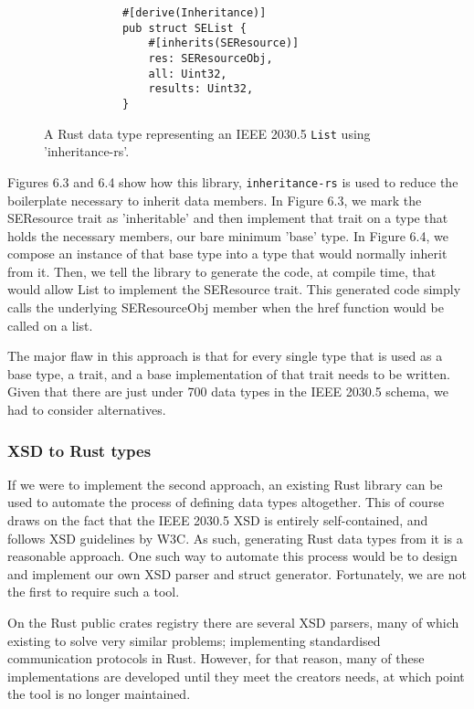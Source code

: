 \begin{figure}[H]
    \begin{center}
        \begin{lstlisting}
            #[derive(Inheritance)]
            pub struct SEList {
                #[inherits(SEResource)]
                res: SEResourceObj,
                all: Uint32,
                results: Uint32,
            }
        \end{lstlisting}
        \label{fig:listinher}
        \caption{A Rust data type representing an IEEE 2030.5 \texttt{List} using 'inheritance-rs'.}
    \end{center}
\end{figure}


Figures 6.3 and 6.4 show how this library, \texttt{inheritance-rs} \cite[]{inheritancers} is used to reduce the boilerplate necessary to inherit data members. 
In Figure 6.3, we mark the SEResource trait as 'inheritable' and then implement that trait on a type that holds the necessary members, our bare minimum 'base' type. 
In Figure 6.4, we compose an instance of that base type into a type that would normally inherit from it. Then, we tell the library to generate the code, at compile time, that would allow List to implement the SEResource trait.
This generated code simply calls the underlying SEResourceObj member when the href function would be called on a list.

The major flaw in this approach is that for every single type that is used as a base type, a trait, and a base implementation of that trait needs to be written.
Given that there are just under 700 data types in the IEEE 2030.5 schema, we had to consider alternatives.


\subsubsection{XSD to Rust types}

If we were to implement the second approach, an existing Rust library can be used to automate the process of defining data types altogether.
This of course draws on the fact that the IEEE 2030.5 XSD is entirely self-contained, and follows XSD guidelines by W3C. As such, generating Rust data types from it is a reasonable approach.
One such way to automate this process would be to design and implement our own XSD parser and struct generator. Fortunately, we are not the first to require such a tool.

On the Rust public crates registry there are several XSD parsers, many of which existing to solve very similar problems; implementing standardised communication protocols in Rust.
However, for that reason, many of these implementations are developed until they meet the creators needs, at which point the tool is no longer maintained.

